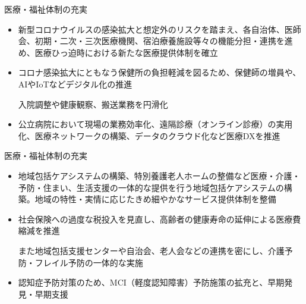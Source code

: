 \documentclass[dvipdfmx]{beamer}
\begin{document}
    \begin{frame}{医療・福祉体制の充実}{}
        \begin{small}
            \begin{itemize}
                \setlength{\parsep}{.5mm}
                \setlength{\itemsep}{2mm}
                \item 新型コロナウイルスの感染拡大と想定外のリスクを踏まえ、各自治体、医師会、初期・二次・三次医療機関、宿泊療養施設等々の機能分担・連携を進め、医療ひっ迫時における新たな医療提供体制を確立
                \item コロナ感染拡大にともなう保健所の負担軽減を図るため、保健師の増員や、AIやIoTなどデジタル化の推進\par
                入院調整や健康観察、搬送業務を円滑化
                \item 公立病院において現場の業務効率化、遠隔診療（オンライン診療）の実用化、医療ネットワークの構築、データのクラウド化など医療DXを推進
            \end{itemize}
        \end{small}
    \end{frame}

    \begin{frame}{医療・福祉体制の充実}{}
        \begin{small}
            \begin{itemize}
                \setlength{\parsep}{.5mm}
                \setlength{\itemsep}{2mm}
                \item 地域包括ケアシステムの構築、特別養護老人ホームの整備など医療・介護・予防・住まい、生活支援の一体的な提供を行う地域包括ケアシステムの構築。地域の特性・実情に応じたきめ細やかなサービス提供体制を整備
                \item 社会保険への過度な税投入を見直し、高齢者の健康寿命の延伸による医療費縮減を推進\par
                また地域包括支援センターや自治会、老人会などの連携を密にし、介護予防・フレイル予防の一体的な実施
                \item 認知症予防対策のため、MCI（軽度認知障害）予防施策の拡充と、早期発見・早期支援
            \end{itemize}
        \end{small}
    \end{frame}
\end{document}
